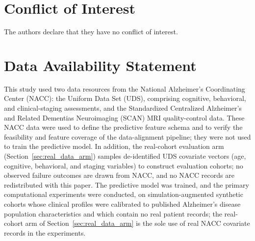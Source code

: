 \documentclass[11pt,a4paper]{article}
\newcommand{\rev}[1]{{\color{red}#1}}
\begin{document}
\section*{Conflict of Interest}
The authors declare that they have no conflict of interest.

\section*{Data Availability Statement}
This study used two data resources from the National Alzheimer's Coordinating
Center (NACC): the Uniform Data Set (UDS), comprising cognitive, behavioral, and
clinical-staging assessments, and the Standardized Centralized Alzheimer's and
Related Dementias Neuroimaging (SCAN) MRI quality-control data. These NACC data
were used to define the predictive feature schema and to verify the
feasibility and feature coverage of the data-alignment pipeline; they were not
used to train the predictive model. \rev{In addition, the real-cohort
evaluation arm (Section~\ref{sec:real_data_arm}) samples de-identified UDS
covariate vectors (age, cognitive, behavioral, and staging variables) to
construct evaluation cohorts; no observed failure outcomes are drawn from
NACC, and no NACC records are redistributed with this paper.} \rev{The predictive model was trained, and the primary computational
experiments were conducted, on} simulation-augmented
synthetic cohorts whose clinical profiles were calibrated to published
Alzheimer's disease population characteristics and which contain no real patient
records\rev{; the real-cohort arm of Section~\ref{sec:real_data_arm} is the
sole use of real NACC covariate records in the experiments}.


\end{document}
